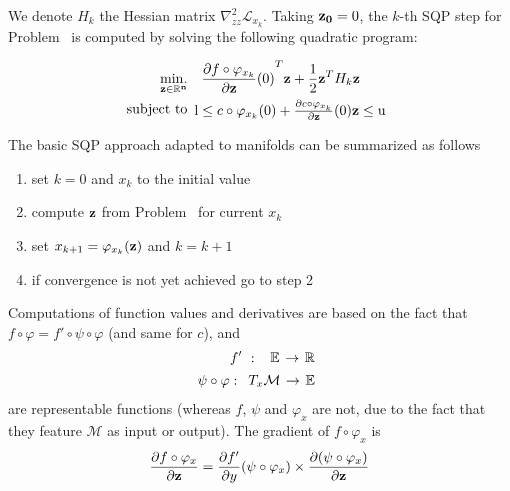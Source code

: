 We denote $H_k$ the Hessian matrix $\nabla_{zz}^2 \mathcal{L}_{x_k}$.
Taking ${\bf z_0} = 0$, the $k$-th SQP step for Problem~ is computed by solving the following quadratic program:

\begin{align}
  \label{eq:SQPStep}
  \minimize_{\bf z \in \mathbb{R}^n } & \quad {\frac{\partial f\circ \varphi_{x_k}}{\partial {\bf z}}(0)}^T {\bf z } + \frac{1}{2} {\bf z }^T H_k{\bf z }\\
  \text{subject to}&
  \begin{array}{lr}
    \text{l} \leq c\circ \varphi_{x_k}(0) + \frac{\partial c\circ \varphi_{x_k}}{\partial {\bf z}}(0) {\bf z }\leq \text{u}\\
  \end{array} \nonumber%
\end{align}

The basic SQP approach adapted to manifolds can be summarized as follows
\begin{enumerate}
  \item set $k=0$ and $x_k$ to the initial value
  \item compute ${\bf z}$ from Problem~ for current $x_k$
  \item set $x_{k+1} = \varphi_{x_k}({\bf z})$ and $k=k+1$
  \item if convergence is not yet achieved go to step 2
\end{enumerate}

Computations of function values and derivatives are based on the fact that $f \circ \varphi = f' \circ \psi \circ \varphi$ (and same for $c$), and
\begin{align}
  f'\ :\
  \begin{array}{ccc}
    \mathbb{E} & \reduce{\rightarrow}{6} & \mathbb{R}
  \end{array} \nonumber\\
  \psi\circ\varphi:
  \begin{array}{ccc}
    T_x{\mathcal{M}} & \reduce{\rightarrow}{6} & \mathbb{E}
  \end{array} \nonumber%
\end{align}
are representable functions (whereas $f$, $\psi$ and $\varphi_x$ are not, due to the fact that they feature $\mathcal{M}$ as input or output).
The gradient of $f \circ \varphi_x$ is
\begin{align}
  \frac{\partial f\circ\varphi_x}{\partial {\bf z}}=
  \frac{\partial f'}{\partial y}(\psi\circ\varphi_x)\times
  \frac{\partial (\psi\circ\varphi_x)}{\partial {\bf z}}
\end{align}

